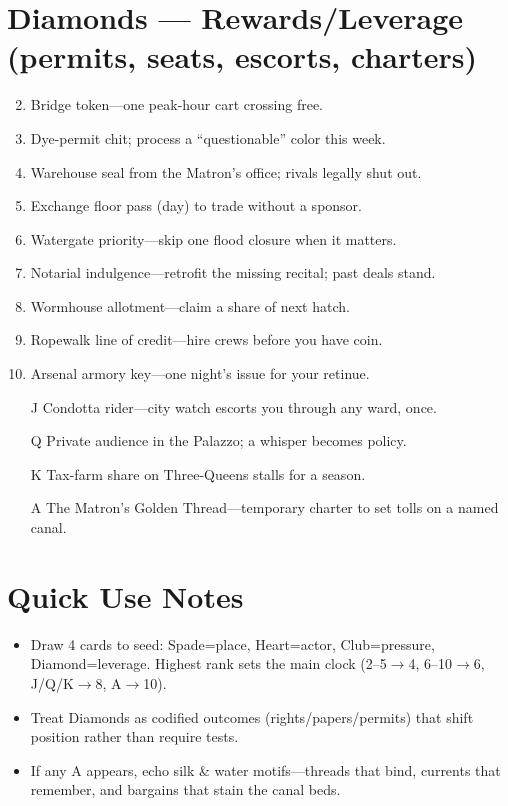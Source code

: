 \section*{Diamonds --- Rewards/Leverage (permits, seats, escorts, charters)}
\label{sec:silkstrand-rewards}
\begin{enumerate}
\setcounter{enumi}{1}
\item Bridge token---one peak-hour cart crossing free.
\item Dye-permit chit; process a ``questionable'' color this week.
\item Warehouse seal from the Matron's office; rivals legally shut out.
\item Exchange floor pass (day) to trade without a sponsor.
\item Watergate priority---skip one flood closure when it matters.
\item Notarial indulgence---retrofit the missing recital; past deals stand.
\item Wormhouse allotment---claim a share of next hatch.
\item Ropewalk line of credit---hire crews before you have coin.
\item Arsenal armory key---one night's issue for your retinue.
\item[J] Condotta rider---city watch escorts you through any ward, once.
\item[Q] Private audience in the Palazzo; a whisper becomes policy.
\item[K] Tax-farm share on Three-Queens stalls for a season.
\item[A] The Matron's Golden Thread---temporary charter to set tolls on a named canal.
\end{enumerate}

\section*{Quick Use Notes}
\label{sec:silkstrand-quick-use}
\begin{itemize}
\item Draw 4 cards to seed: Spade=place, Heart=actor, Club=pressure, Diamond=leverage. Highest rank sets the main clock (2--5$\rightarrow$4, 6--10$\rightarrow$6, J/Q/K$\rightarrow$8, A$\rightarrow$10).
\item Treat Diamonds as codified outcomes (rights/papers/permits) that shift position rather than require tests.
\item If any A appears, echo silk \& water motifs---threads that bind, currents that remember, and bargains that stain the canal beds.
\end{itemize}

